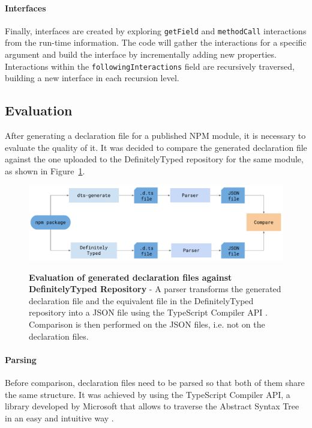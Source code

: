 \documentclass[a4paper,english,cleveref, autoref]{lipics-v2019}
\newcommand{\figref}[1]{Figure~\ref{#1}}
\begin{document}
\paragraph*{Interfaces}
Finally, interfaces are created by exploring \lstinline{getField} and \lstinline{methodCall} interactions from the run-time information. The code will gather the interactions for a specific argument and build the interface by incrementally adding new properties. Interactions within the \lstinline{followingInteractions} field are recursively traversed, building a new interface in each recursion level.

\subsection{Evaluation}
\label{sec:dts-generate-evaluation}
After generating a declaration file for a published NPM module, it is necessary to evaluate the quality of it. It was decided to compare the generated declaration file against the one uploaded to the DefinitelyTyped repository for the same module, as shown in \figref{fig:evaluation-diagram}.

\begin{figure}[tp]
    \begin{centering}
        {\includegraphics[width=1\textwidth]{evaluation-diagram.pdf}}
        \caption[Evaluation against DefinitelyTyped Repository]{\textbf{Evaluation of generated declaration files against DefinitelyTyped Repository} - A parser transforms the generated declaration file and the equivalent file in the DefinitelyTyped repository into a JSON file using the TypeScript Compiler API \cite{typescript-compiler-api}. Comparison is then performed on the JSON files, i.e. not on the declaration files.}
        \label{fig:evaluation-diagram}
    \end{centering}
\end{figure}

\paragraph*{Parsing}
Before comparison, declaration files need to be parsed so that both of them share the same structure. It was achieved by using the TypeScript Compiler API, a library developed by Microsoft that allows to traverse the Abstract Syntax Tree in an easy and intuitive way \cite{typescript-compiler-api}.
\end{document}
